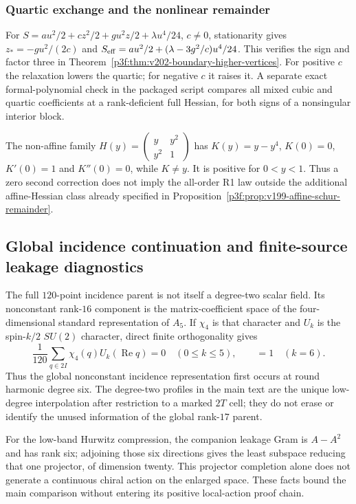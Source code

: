 \documentclass[11pt,a4paper]{article}
\begin{document}
\subsubsection{Quartic exchange and the nonlinear remainder}
\label{p3f:app:v202-vertex-diagnostics}
For $S=au^2/2+cz^2/2+gu^2z/2+\lambda u^4/24$, $c\ne0$,
stationarity gives $z_*=-gu^2/(2c)$ and
$S_{\rm eff}=au^2/2+(\lambda-3g^2/c)u^4/24$.
This verifies the sign and factor three in
Theorem~\ref{p3f:thm:v202-boundary-higher-vertices}. For positive $c$
the relaxation lowers the quartic; for negative $c$ it raises it. A
separate exact formal-polynomial check in the packaged script compares
all mixed cubic and quartic coefficients at a rank-deficient full Hessian,
for both signs of a nonsingular interior block.

The non-affine family
$H(y)=\left(\begin{smallmatrix}y&y^2\\y^2&1\end{smallmatrix}\right)$
has $K(y)=y-y^4$, $K(0)=0$, $K'(0)=1$ and $K''(0)=0$, while $K\ne y$.
It is positive for $0<y<1$. Thus a zero second correction does not imply
the all-order R1 law outside the additional affine-Hessian class already
specified in Proposition~\ref{p3f:prop:v199-affine-schur-remainder}.


\subsection{Global incidence continuation and finite-source leakage diagnostics}
\label{p3f:app:v180-incidence-continuation-diagnostics}
The full $120$-point incidence parent is not itself a degree-two scalar
field.  Its nonconstant rank-$16$ component is the matrix-coefficient space of
the four-dimensional standard representation of $A_5$.  If $\chi_4$ is that
character and $U_k$ is the spin-$k/2$ $SU(2)$ character, direct finite
orthogonality gives
\[
 \frac1{120}\sum_{q\in2I}\chi_4(q)U_k(\operatorname{Re}q)
 =0\quad(0\le k\le5),\qquad =1\quad(k=6).
\]
Thus the global nonconstant incidence representation first occurs at round
harmonic degree six.  The degree-two profiles in the main text are the unique
low-degree interpolation after restriction to a marked $2T$ cell; they do
not erase or identify the unused information of the global rank-$17$ parent.

For the low-band Hurwitz compression, the companion leakage Gram is
$A-A^2$ and has rank six; adjoining those six directions gives the least
subspace reducing that one projector, of dimension twenty.  This projector
completion alone does not generate a continuous chiral action on the enlarged
space.  These facts bound the main comparison without entering its positive
local-action proof chain.
\end{document}
